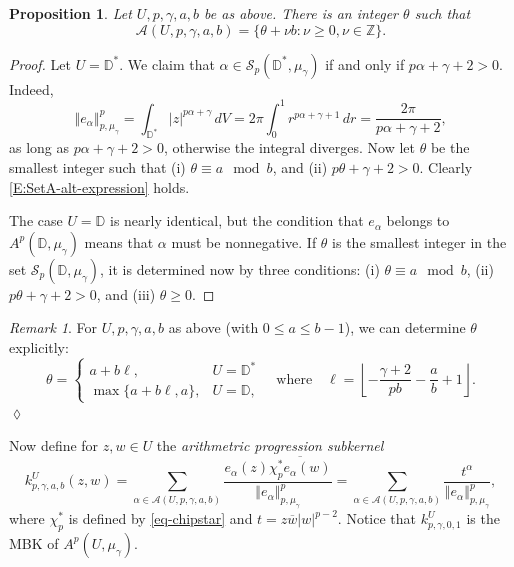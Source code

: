 \documentclass[letterpaper,11pt,reqno]{amsart}
\theoremstyle{plain}
\newtheorem{proposition}[equation]{Proposition}
\theoremstyle{definition}
\theoremstyle{remark}
\theoremstyle{remark}
\newtheorem{remark}[equation]{Remark}
\numberwithin{equation}{section}
\newcommand{\abs}[1]{\left\vert#1\right\vert}
\newcommand{\norm}[1]{\left\Vert#1\right\Vert}
\newcommand{\ol}{\overline}
\newcommand{\mug}{{\mu_{\gamma}}}
\newcommand{\ca}{{\mathcal A}}
\newcommand{\cs}{{\mathcal S}}
\newcommand{\D}{{\mathbb D}}
\newcommand{\Z}{{\mathbb Z}}
\begin{document}
\begin{proposition}\label{P:SetA-arith-prog}
Let $U,p,\gamma,a,b$ be as above. There is an integer $\theta$
such that 
\begin{equation}\label{E:SetA-alt-expression}
\ca(U,p,\gamma,a,b) = \{\theta+\nu b: \nu\geq0, \nu\in \Z\}.
\end{equation}
\end{proposition}
\begin{proof}
Let $U = \D^*$.
We claim that $\alpha \in \cs_p(\D^*,\mug)$ if and only if $p\alpha + \gamma + 2 > 0$. 
Indeed,
\begin{equation}\label{E:monomial-norm-on-disc}
\norm{e_\alpha}_{p,\mug}^p = \int_{\D^*} |z|^{p\alpha+\gamma}\,dV = 2\pi\int_0^1 r^{p\alpha+\gamma+1}\,dr = \frac{2\pi}{p\alpha + \gamma + 2},
\end{equation}
as long as $p\alpha + \gamma + 2 > 0$, otherwise the integral diverges.
Now let $\theta$ be the smallest integer such that 
(i) $\theta \equiv a \mod b$, and (ii) $p\theta+\gamma+2>0$.  Clearly 
\eqref{E:SetA-alt-expression} holds.

The case $U = \D$ is nearly identical, but the condition that $e_\alpha$
belongs to $A^p(\D, \mug)$ means that $\alpha$ must be nonnegative.
If $\theta$ is the smallest integer in the set $\cs_p(\D,\mug)$, it is determined now by three conditions: (i) $\theta \equiv a \mod b$, (ii) $p\theta+\gamma+2>0$, and (iii) $\theta \ge 0$.
\end{proof}
\begin{remark}
For $U,p,\gamma,a,b$ as above (with $0\le a \le b-1$), we can determine $\theta$ explicitly:
\begin{equation*}
\theta = 
\begin{cases}
a + b\ell, & U = \D^* \\
\max\{a + b\ell,a\}, & U = \D,
\end{cases}
\quad \text{where} \quad
\ell = \left\lfloor -\frac{\gamma+2}{pb} - \frac{a}{b} + 1 \right\rfloor.
\end{equation*}
\hfill $\lozenge$
\end{remark}

Now define for $z,w \in U$ the {\em arithmetric progression subkernel}
\begin{equation}\label{D:arith-prog-kern}
k^{U}_{p,\gamma,a,b}(z,w)
= \sum_{\alpha \in \ca(U,p,\gamma,a,b)} \frac{e_\alpha(z) \ol{\chi_p^*e_\alpha(w)}} {\norm{e_\alpha}_{p,\mug}^p} 
= \sum_{\alpha \in \ca(U,p,\gamma,a,b)} \frac{t^\alpha}{\norm{e_\alpha}_{p,\mug}^p},
\end{equation}
where $\chi_p^*$ is defined by \eqref{eq-chipstar} and $t = z \ol{w} \abs{w}^{p-2}$.   Notice that
$k^U_{p,\gamma, 0,1}$ is the MBK of $A^p(U,\mug)$.
\end{document}
